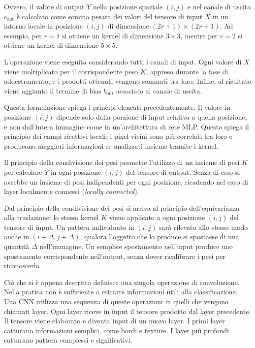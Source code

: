 Ovvero, il valore di output $Y$ nella posizione spaziale $(i, j)$ e nel canale di uscita $c_{\text{out}}$ è calcolato come somma pesata dei valori del tensore di input $X$ in un intorno locale in posizione $(i, j)$ di dimensione $(2r+1) \times (2r+1)$. Ad esempio, per $r=1$ si ottiene un kernel di dimensione $3\times3$, mentre per $r=2$ si ottiene un kernel di dimensione $5\times5$.

L'operazione viene eseguita considerando tutti i canali di input. Ogni valore di $X$ viene moltiplicato per il corrispondente peso $K$, appreso durante la fase di addestramento, e i prodotti ottenuti vengono sommati tra loro. Infine, al risultato viene aggiunto il termine di bias $b_{\text{out}}$ associato al canale di uscita.

Questa formulazione spiega i principi elencati precedentemente.
Il valore in posizione $(i, j)$ dipende solo dalla porzione di input relativa a quella posizione, e non dall’intera immagine come in un’architettura di rete MLP. Questo spiega il principio dei campi ricettivi locali: i pixel vicini sono più correlati tra loro e producono maggiori informazioni se analizzati insieme tramite i kernel.

Il principio della condivisione dei pesi permette l’utilizzo di un insieme di pesi $K$ per calcolare $Y$ in ogni posizione $(i, j)$ del tensore di output. Senza di esso si avrebbe un insieme di pesi indipendenti per ogni posizione, ricadendo nel caso di layer localmente connessi (\textit{locally connected}).

Dal principio della condivisione dei pesi si arriva al principio dell'equivarianza alla traslazione: lo stesso kernel $K$ viene applicato a ogni posizione $(i, j)$ del tensore di input. Un pattern individuato in $(i, j)$ sarà rilevato allo stesso modo anche in $(i + \Delta, j + \Delta)$, qualora l'oggetto che lo produce si spostasse di una quantità $\Delta$ nell’immagine. Un semplice spostamento nell’input produce uno spostamento corrispondente nell’output, senza dover ricalibrare i pesi per riconoscerlo.

Ciò che si è appena descritto definisce una singola operazione di convoluzione. Nella pratica non è sufficiente a estrarre informazioni utili alla classificazione. Una CNN utilizza una sequenza di queste operazioni in quelli che vengono chiamati layer. Ogni layer riceve in input il tensore prodotto dal layer precedente. Il tensore viene elaborato e diventa input di un nuovo layer. I primi layer catturano informazioni semplici, come bordi e texture. I layer più profondi catturano pattern complessi e significativi.

